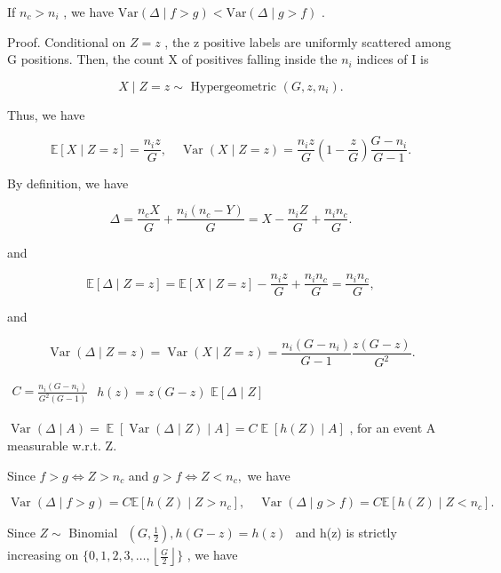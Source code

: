\documentclass[
  10
]{article}
\begin{document}
If \(n _ { c } > n _ { i }\) , we have
\(\mathrm { V a r } ( \Delta \mid f > g ) < \mathrm { V a r } ( \Delta \mid g > f )\)
.

Proof. Conditional on \(Z = z\) , the z positive labels are uniformly
scattered among G positions. Then, the count X of positives falling
inside the \(n _ { i }\) indices of I is

\[
X \mid Z = z \sim \text { Hypergeometric } (G, z, n _ {i}).
\]

Thus, we have

\[
\mathbb {E} [ X \mid Z = z ] = \frac {n _ {i} z}{G}, \quad \operatorname{Var} (X \mid Z = z) = \frac {n _ {i} z}{G} (1 - \frac {z}{G}) \frac {G - n _ {i}}{G - 1}.
\]

By definition, we have

\[
\Delta = \frac {n _ {c} X}{G} + \frac {n _ {i} (n _ {c} - Y)}{G} = X - \frac {n _ {i} Z}{G} + \frac {n _ {i} n _ {c}}{G}.
\]

and

\[
\mathbb {E} [ \Delta \mid Z = z ] = \mathbb {E} [ X \mid Z = z ] - \frac {n _ {i} z}{G} + \frac {n _ {i} n _ {c}}{G} = \frac {n _ {i} n _ {c}}{G},
\]

and

\[
\operatorname{Var} (\Delta \mid Z = z) = \operatorname{Var} (X \mid Z = z) = \frac {n _ {i} (G - n _ {i})}{G - 1} \frac {z (G - z)}{G ^ {2}}.
\]

\(\begin{array} { r } { C = \frac { n _ { i } ( G - n _ { i } ) } { G ^ { 2 } ( G - 1 ) } } \end{array}\)
\(h ( z ) = z ( G - z )\) \(\mathbb { E } [ \Delta \mid Z ]\)

\(\operatorname { V a r } ( \Delta \mid A ) = \operatorname { \mathbb { E } } [ \operatorname { V a r } ( \Delta \mid Z ) \mid A ] = C \operatorname { \mathbb { E } } [ h ( Z ) \mid A ]\)
, for an event A measurable w.r.t. Z.

Since \(f > g \iff Z > n _ { c }\) and \(g > f \iff Z < n _ { c } ,\) we
have

\[
\operatorname{Var} (\Delta \mid f > g) = C \mathbb {E} [ h (Z) \mid Z > n _ {c} ], \quad \operatorname{Var} (\Delta \mid g > f) = C \mathbb {E} [ h (Z) \mid Z <   n _ {c} ].
\]

Since \(Z \sim\) Binomial
\(\begin{array} { r } { ( G , \frac { 1 } { 2 } ) , h ( G - z ) = h ( z ) } \end{array}\)
and h(z) is strictly increasing on
\(\{ 0 , 1 , 2 , 3 , \ldots , \left\lfloor { \frac { G } { 2 } } \right\rfloor \}\)
, we have
\end{document}
